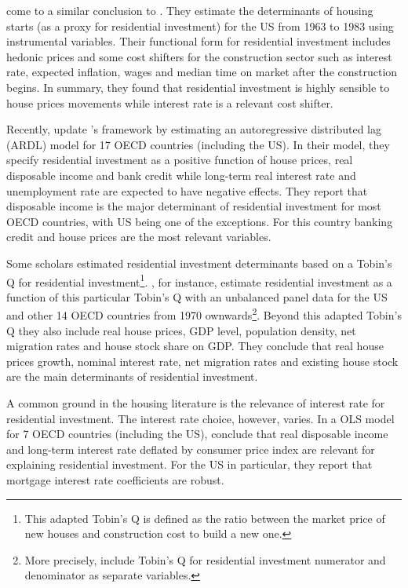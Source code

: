 \documentclass[12pt, a4paper]{article}
\begin{document}
\textcite{topel_1988_Housing} come to a similar conclusion to \textcite{poterba_tax_1984}.
They estimate the determinants of housing starts (as a proxy for residential investment) for the US from 1963 to 1983 using instrumental variables.
Their functional form for residential investment includes hedonic prices and some cost shifters for the construction sector such as interest rate, expected inflation, wages and median time on market after the construction begins.
In summary, they found that residential investment is highly sensible to house prices movements while interest rate is a relevant cost shifter.

Recently,  \textcite{arestis_residential_2015} update \citeauthor*{poterba_tax_1984}'s \citeyear{poterba_tax_1984} framework by estimating an autoregressive distributed lag (ARDL) model for 17 OECD countries (including the US).
In their model, they specify residential investment as a positive function of house prices, real disposable income and bank credit while long-term real interest rate and unemployment rate are expected to have negative effects.
They report that disposable income is the major determinant of residential investment for most OECD countries, with US being one of the exceptions.
For this country banking credit and house prices are the most relevant variables.

Some scholars estimated residential investment determinants based on a Tobin's Q for residential investment\footnote{This adapted Tobin's Q is defined as the ratio between the market price of new houses and construction cost to build a new one.}.
\textcite{kohlscheen_2018_Residential}, for instance, estimate residential investment as a function of this particular Tobin's Q with an unbalanced panel data for the US and other 14 OECD countries from 1970 ownwards\footnote{More precisely, \textcite{kohlscheen_2018_Residential} include Tobin's Q for residential investment numerator and denominator as separate variables.}.
Beyond this adapted Tobin's Q they also include real house prices, GDP level, population density, net migration rates and house stock share on GDP.
They conclude that real house prices growth, nominal interest rate, net migration rates and existing house stock are the main determinants of residential investment.

A common ground in the housing literature is the relevance of interest rate for residential investment.
The interest rate choice, however, varies.
In a OLS model for 7 OECD countries (including the US), \textcite{egebo_1990_MODEL} conclude that real disposable income and long-term interest rate deflated by consumer price index are relevant for explaining residential investment.
For the US in particular, they report that mortgage interest rate coefficients are robust.
\end{document}
